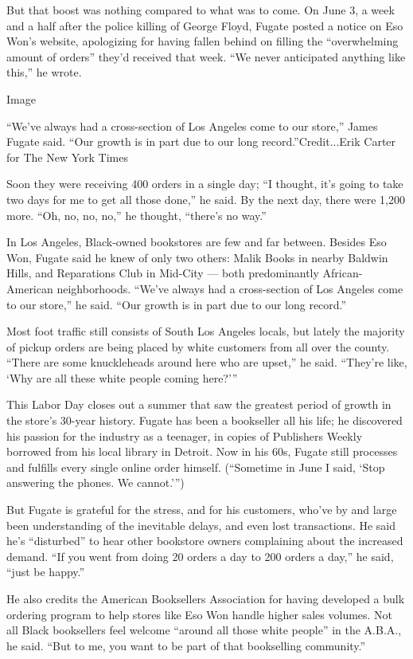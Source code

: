 But that boost was nothing compared to what was to come. On June 3, a
week and a half after the police killing of George Floyd, Fugate posted
a notice on Eso Won's website, apologizing for having fallen behind on
filling the ``overwhelming amount of orders'' they'd received that week.
``We never anticipated anything like this,'' he wrote.

Image

``We've always had a cross-section of Los Angeles come to our store,''
James Fugate said. ``Our growth is in part due to our long
record.''Credit...Erik Carter for The New York Times

Soon they were receiving 400 orders in a single day; ``I thought, it's
going to take two days for me to get all those done,'' he said. By the
next day, there were 1,200 more. ``Oh, no, no, no,'' he thought,
``there's no way.''

In Los Angeles, Black-owned bookstores are few and far between. Besides
Eso Won, Fugate said he knew of only two others: Malik Books in nearby
Baldwin Hills, and Reparations Club in Mid-City --- both predominantly
African-American neighborhoods. ``We've always had a cross-section of
Los Angeles come to our store,'' he said. ``Our growth is in part due to
our long record.''

Most foot traffic still consists of South Los Angeles locals, but lately
the majority of pickup orders are being placed by white customers from
all over the county. ``There are some knuckleheads around here who are
upset,'' he said. ``They're like, `Why are all these white people coming
here?'''

This Labor Day closes out a summer that saw the greatest period of
growth in the store's 30-year history. Fugate has been a bookseller all
his life; he discovered his passion for the industry as a teenager, in
copies of Publishers Weekly borrowed from his local library in Detroit.
Now in his 60s, Fugate still processes and fulfills every single online
order himself. (``Sometime in June I said, `Stop answering the phones.
We cannot.''')

But Fugate is grateful for the stress, and for his customers, who've by
and large been understanding of the inevitable delays, and even lost
transactions. He said he's ``disturbed'' to hear other bookstore owners
complaining about the increased demand. ``If you went from doing 20
orders a day to 200 orders a day,'' he said, ``just be happy.''

He also credits the American Booksellers Association for having
developed a bulk ordering program to help stores like Eso Won handle
higher sales volumes. Not all Black booksellers feel welcome ``around
all those white people'' in the A.B.A., he said. ``But to me, you want
to be part of that bookselling community.''

